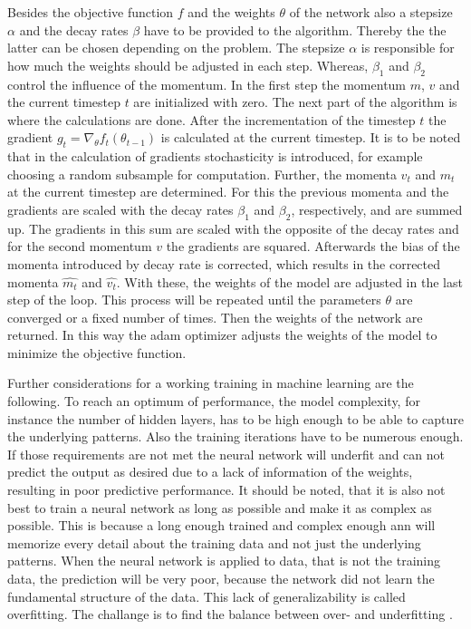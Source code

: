 Besides the objective function $f$ and the weights $\theta$ of the network also a stepsize $\alpha$ and the decay rates $\beta$ have to be provided to the algorithm.
Thereby the the latter can be chosen depending on the problem. 
The stepsize $\alpha$ is responsible for how much the weights should be adjusted in each step.
Whereas, $\beta_1$ and $\beta_2$ control the influence of the momentum.
In the first step the momentum $m$, $v$ and the current timestep $t$ are initialized with zero.
The next part of the algorithm is where the calculations are done.
After the incrementation of the timestep $t$ the gradient $g_t = \nabla_\theta f_t(\theta_{t-1})$ is calculated at the current timestep. 
It is to be noted that in the calculation of gradients stochasticity is introduced, for example choosing a random subsample for computation. 
Further, the momenta $v_t$ and $m_t$ at the current timestep are determined.
For this the previous momenta and the gradients are scaled with the decay rates $\beta_1$ and $\beta_2$, respectively, and are summed up.
The gradients in this sum are scaled with the opposite of the decay rates and for the second momentum $v$ the gradients are squared.
Afterwards the bias of the momenta introduced by decay rate is corrected, which results in the corrected momenta $\hat{m_t}$ and $\hat{v_t}$.
With these, the weights of the model are adjusted in the last step of the loop.
This process will be repeated until the parameters $\theta$ are converged or a fixed number of times.
Then the weights of the network are returned.
In this way the adam optimizer adjusts the weights of the model to minimize the objective function.

Further considerations for a working training in machine learning are the following.
To reach an optimum of performance, the model complexity, for instance the number of hidden layers, has to be high enough to be able to capture the underlying patterns.
Also the training iterations have to be numerous enough.
If those requirements are not met the neural network will underfit and can not predict the output as desired due to a lack of information of the weights, resulting in poor predictive performance.
It should be noted, that it is also not best to train a neural network as long as possible and make it as complex as possible.
This is because a long enough trained and complex enough \acs{ann} will memorize every detail about the training data and not just the underlying patterns.
When the neural network is applied to data, that is not the training data, the prediction will be very poor, because the network did not learn the fundamental structure of the data.
This lack of generalizability is called overfitting. The challange is to find the balance between over- and underfitting \cite{smith2018disciplined}.

